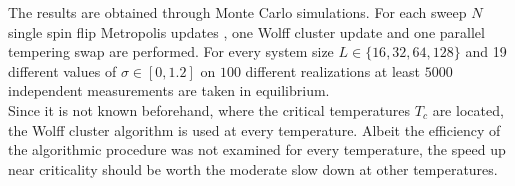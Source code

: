 \label{sec:results}
The results are obtained through Monte Carlo simulations. For each
sweep \(N\) single spin flip Metropolis updates \cite{Metropolis1953},
one Wolff cluster update \cite{Wolff1989} and one
parallel tempering swap \cite{ParallelTempering1986} are performed.
For every system size $L \in \{16,32,64,128\}$ and 19 different values of
$\sigma \in [0,1.2]$ on $100$ different realizations at least $5000$
independent measurements are taken in equilibrium.\\
Since it is not known beforehand, where the critical temperatures \(T_c\)
are located, the Wolff cluster algorithm is used at every
temperature. Albeit the efficiency of the algorithmic procedure was
not examined for every temperature, the speed up near criticality
should be worth the moderate slow down at other temperatures.\\

